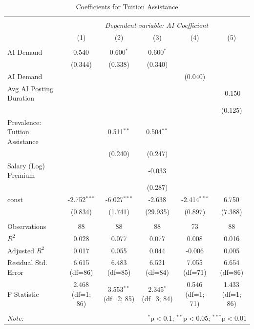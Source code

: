 \begin{table}[!htbp] \centering
  \caption{Coefficients for Tuition Assistance}
\begin{tabular}{@{\extracolsep{5pt}}lccccc}
\\[-1.8ex]\hline
\hline \\[-1.8ex]
& \multicolumn{5}{c}{\textit{Dependent variable: AI Coefficient}} \
\cr \cline{2-6}
\\[-1.8ex] & (1) & (2) & (3) & (4) & (5) \\
\hline \\[-1.8ex]
 AI Demand & 0.540$^{}$ & 0.600$^{*}$ & 0.600$^{*}$ & & \\
& (0.344) & (0.338) & (0.340) & & \\
 AI Demand %
& & & & (0.040) & \\
 Avg AI Posting Duration & & & & & -0.150$^{}$ \\
& & & & & (0.125) \\
 Prevalence: Tuition Assistance & & 0.511$^{**}$ & 0.504$^{**}$ & & \\
& & (0.240) & (0.247) & & \\
 Salary (Log) Premium & & & -0.033$^{}$ & & \\
& & & (0.287) & & \\
 const & -2.752$^{***}$ & -6.027$^{***}$ & -2.638$^{}$ & -2.414$^{***}$ & 6.750$^{}$ \\
& (0.834) & (1.741) & (29.935) & (0.897) & (7.388) \\
\hline \\[-1.8ex]
 Observations & 88 & 88 & 88 & 73 & 88 \\
 $R^2$ & 0.028 & 0.077 & 0.077 & 0.008 & 0.016 \\
 Adjusted $R^2$ & 0.017 & 0.055 & 0.044 & -0.006 & 0.005 \\
 Residual Std. Error & 6.615 (df=86) & 6.483 (df=85) & 6.521 (df=84) & 7.055 (df=71) & 6.654 (df=86) \\
 F Statistic & 2.468$^{}$ (df=1; 86) & 3.553$^{**}$ (df=2; 85) & 2.345$^{*}$ (df=3; 84) & 0.546$^{}$ (df=1; 71) & 1.433$^{}$ (df=1; 86) \\
\hline
\hline \\[-1.8ex]
\textit{Note:} & \multicolumn{5}{r}{$^{*}$p$<$0.1; $^{**}$p$<$0.05; $^{***}$p$<$0.01} \\
\end{tabular}
\end{table}